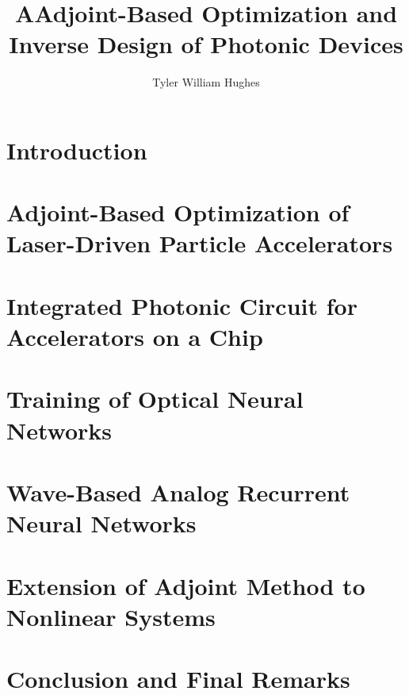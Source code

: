 \documentclass{report}
\begin{document}
\title{AAdjoint-Based Optimization and Inverse Design of Photonic Devices}

\author{Tyler William Hughes}

 
\beforepreface
{}


\afterpreface




\chapter{Introduction}


\chapter{Adjoint-Based Optimization of Laser-Driven Particle Accelerators}


\chapter{Integrated Photonic Circuit for Accelerators on a Chip}


\chapter{Training of Optical Neural Networks}


\chapter{Wave-Based Analog Recurrent Neural Networks}


\chapter{Extension of Adjoint Method to Nonlinear Systems}


\chapter{Conclusion and Final Remarks}

\end{document}
